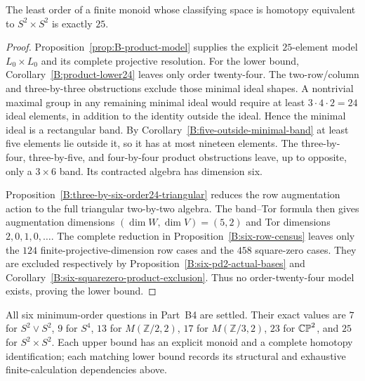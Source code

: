 \begin{theorem}\label{B:product-minimum25}
The least order of a finite monoid whose classifying space is
homotopy equivalent to $S^2\times S^2$ is exactly $25$.
\end{theorem}
\begin{proof}
Proposition~\ref{prop:B-product-model} supplies the explicit
$25$-element model $L_0\times L_0$ and its complete projective
resolution.  For the lower bound,
Corollary~\ref{B:product-lower24} leaves only order twenty-four.
The two-row/column and three-by-three obstructions exclude those
minimal ideal shapes.  A nontrivial maximal group in any remaining
minimal ideal would require at least
$3\cdot4\cdot2=24$ ideal elements, in addition to the identity
outside the ideal.  Hence the minimal ideal is a rectangular band.
By Corollary~\ref{B:five-outside-minimal-band} at least five
elements lie outside it, so it has at most nineteen elements.
The three-by-four, three-by-five, and four-by-four product
obstructions leave, up to opposite, only a $3\times6$ band.
Its contracted algebra has dimension six.

Proposition~\ref{B:three-by-six-order24-triangular} reduces the
row augmentation action to the full triangular two-by-two algebra.
The band--Tor formula then gives augmentation dimensions
$(\dim W,\dim V)=(5,2)$ and Tor dimensions $2,0,1,0,\ldots$.
The complete reduction in Proposition~\ref{B:six-row-census}
leaves only the $124$ finite-projective-dimension row cases and
the $458$ square-zero cases.  They are excluded respectively by
Proposition~\ref{B:six-pd2-actual-bases} and
Corollary~\ref{B:six-squarezero-product-exclusion}.
Thus no order-twenty-four model exists, proving the lower bound.
\end{proof}

\begin{remark}\label{rem:B-unresolved-minima}
All six minimum-order questions in Part~B4 are settled.  Their
exact values are $7$ for $S^2\vee S^2$, $9$ for $S^4$,
$13$ for $M(\mathbb Z/2,2)$, $17$ for $M(\mathbb Z/3,2)$,
$23$ for $\mathbb {CP}^2$, and $25$ for $S^2\times S^2$.
Each upper bound has an explicit monoid and a complete homotopy
identification; each matching lower bound records its structural
and exhaustive finite-calculation dependencies above.
\end{remark}

